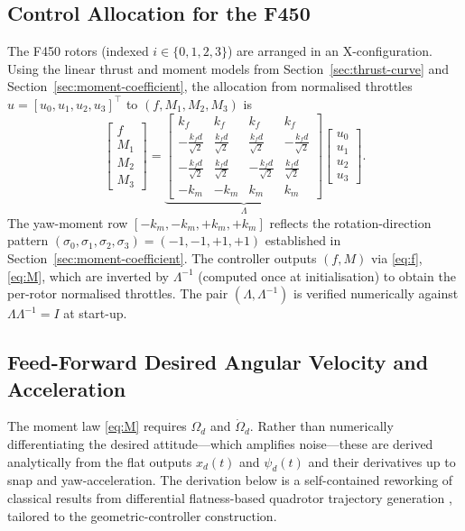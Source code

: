 \documentclass[11pt]{article}
\theoremstyle{remark}
\begin{document}
\subsection{Control Allocation for the F450}
\label{sec:alloc}
The F450 rotors (indexed $i \in \{0, 1, 2, 3\}$) are arranged in an X-configuration. Using the linear thrust and moment models from Section~\ref{sec:thrust-curve} and Section~\ref{sec:moment-coefficient}, the allocation from normalised throttles $u = [u_0, u_1, u_2, u_3]^\top$ to $(f, M_1, M_2, M_3)$ is
\begin{equation}
    \begin{bmatrix} f \\ M_1 \\ M_2 \\ M_3 \end{bmatrix}
    =
    \underbrace{
    \begin{bmatrix}
        k_f & k_f & k_f & k_f \\
       -\frac{k_f d}{\sqrt{2}} &  \frac{k_f d}{\sqrt{2}} &  \frac{k_f d}{\sqrt{2}} & -\frac{k_f d}{\sqrt{2}} \\
       -\frac{k_f d}{\sqrt{2}} &  \frac{k_f d}{\sqrt{2}} & -\frac{k_f d}{\sqrt{2}} &  \frac{k_f d}{\sqrt{2}} \\
       -k_m & -k_m & k_m & k_m
    \end{bmatrix}}_{\Lambda}
    \begin{bmatrix} u_0 \\ u_1 \\ u_2 \\ u_3 \end{bmatrix}.
\end{equation}
The yaw-moment row $[-k_m, -k_m, +k_m, +k_m]$ reflects the rotation-direction pattern $(\sigma_0, \sigma_1, \sigma_2, \sigma_3) = (-1, -1, +1, +1)$ established in Section~\ref{sec:moment-coefficient}. The controller outputs $(f, M)$ via \eqref{eq:f}, \eqref{eq:M}, which are inverted by $\Lambda^{-1}$ (computed once at initialisation) to obtain the per-rotor normalised throttles. The pair $(\Lambda, \Lambda^{-1})$ is verified numerically against $\Lambda \Lambda^{-1} = I$ at start-up.

\subsection{Feed-Forward Desired Angular Velocity and Acceleration}
\label{sec:feedforward}
The moment law \eqref{eq:M} requires $\Omega_d$ and $\dot\Omega_d$. Rather than numerically differentiating the desired attitude---which amplifies noise---these are derived analytically from the flat outputs $x_d(t)$ and $\psi_d(t)$ and their derivatives up to snap and yaw-acceleration. The derivation below is a self-contained reworking of classical results from differential flatness-based quadrotor trajectory generation \cite{Mellinger2011}, tailored to the geometric-controller construction.
\end{document}
